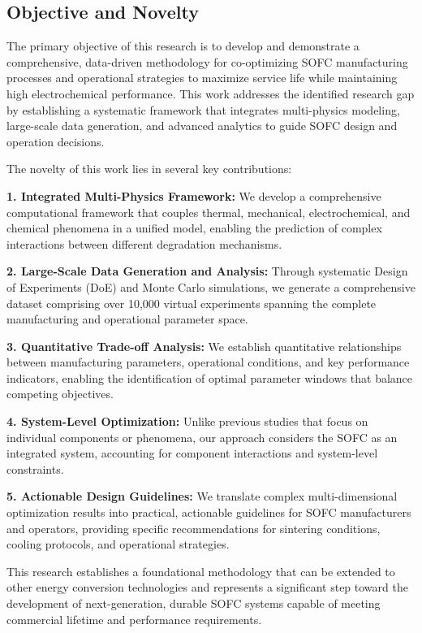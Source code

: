 \documentclass[conference]{IEEEtran}
\begin{document}
\subsection{Objective and Novelty}

The primary objective of this research is to develop and demonstrate a comprehensive, data-driven methodology for co-optimizing SOFC manufacturing processes and operational strategies to maximize service life while maintaining high electrochemical performance. This work addresses the identified research gap by establishing a systematic framework that integrates multi-physics modeling, large-scale data generation, and advanced analytics to guide SOFC design and operation decisions.

The novelty of this work lies in several key contributions:

\textbf{1. Integrated Multi-Physics Framework:} We develop a comprehensive computational framework that couples thermal, mechanical, electrochemical, and chemical phenomena in a unified model, enabling the prediction of complex interactions between different degradation mechanisms.

\textbf{2. Large-Scale Data Generation and Analysis:} Through systematic Design of Experiments (DoE) and Monte Carlo simulations, we generate a comprehensive dataset comprising over 10,000 virtual experiments spanning the complete manufacturing and operational parameter space.

\textbf{3. Quantitative Trade-off Analysis:} We establish quantitative relationships between manufacturing parameters, operational conditions, and key performance indicators, enabling the identification of optimal parameter windows that balance competing objectives.

\textbf{4. System-Level Optimization:} Unlike previous studies that focus on individual components or phenomena, our approach considers the SOFC as an integrated system, accounting for component interactions and system-level constraints.

\textbf{5. Actionable Design Guidelines:} We translate complex multi-dimensional optimization results into practical, actionable guidelines for SOFC manufacturers and operators, providing specific recommendations for sintering conditions, cooling protocols, and operational strategies.

This research establishes a foundational methodology that can be extended to other energy conversion technologies and represents a significant step toward the development of next-generation, durable SOFC systems capable of meeting commercial lifetime and performance requirements.
\end{document}
